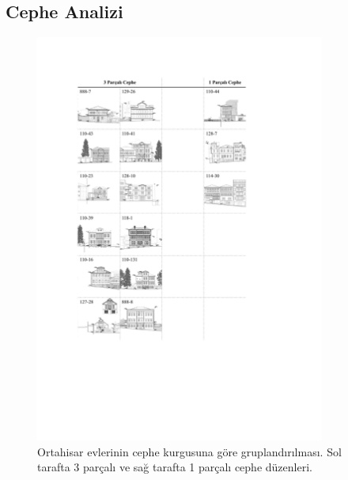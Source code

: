 \documentclass[12pt,turkish,a4paperpaper,]{report}
\begin{document}
\newpage

\hypertarget{cephe-analizi}{%
\subsection{Cephe Analizi}\label{cephe-analizi}}

\begin{figure}
\centering
\includegraphics[width=0.85\textwidth,height=\textheight]{source/figures/cephegruplandirma.pdf}
\caption{Ortahisar evlerinin cephe kurgusuna göre gruplandırılması. Sol
tarafta 3 parçalı ve sağ tarafta 1 parçalı cephe düzenleri.
\label{cephegruplama}}
\end{figure}

\newpage
\end{document}

